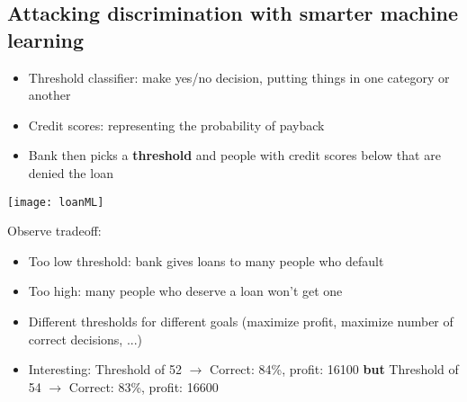 \documentclass[12pt,a4paper]{article}
\begin{document}
\subsection{Attacking discrimination with smarter machine learning}
\begin{itemize}
\item Threshold classifier: make yes/no decision, putting things in one category or another
\item Credit scores: representing the probability of payback
\item Bank then picks a \textbf{threshold} and people with credit scores below that are denied the loan
\end{itemize}
\texttt{[image: loanML]}
\begin{description}
\item Observe tradeoff: 
\begin{itemize}
\item Too low threshold: bank gives loans to many people who default
\item Too high: many people who deserve a loan won't get one
\end{itemize}
\end{description}
\begin{itemize}
\item Different thresholds for different goals (maximize profit, maximize number of correct decisions, ...)
\item Interesting: Threshold of 52 \(\rightarrow\) Correct: 84\%, profit: 16100 \textbf{but} Threshold of 54 \(\rightarrow\) Correct: 83\%, profit: 16600
\end{itemize}
\end{document}
